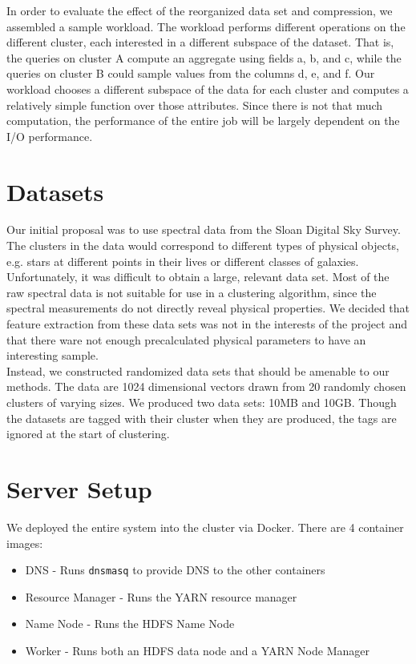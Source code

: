 \documentclass[paper=letter, fontsize=11pt]{scrartcl}
\numberwithin{equation}{section}		%
\numberwithin{figure}{section}			%
\numberwithin{table}{section}				%
\begin{document}
In order to evaluate the effect of the reorganized data set and compression, we assembled a sample workload. The workload performs different operations on the different cluster, each interested in a different subspace of the dataset.
That is, the queries on cluster A compute an aggregate using fields a, b, and c, while the queries on cluster B could sample values from the columns d, e, and f.
Our workload chooses a different subspace of the data for each cluster and computes a relatively simple function over those attributes.
Since there is not that much computation, the performance of the entire job will be largely dependent on the I/O performance.\\

\section{Datasets}
Our initial proposal was to use spectral data from the Sloan Digital Sky Survey.  The clusters in the data would correspond to different types of physical objects, e.g. stars at different points in their lives or different classes of galaxies.  Unfortunately, it was difficult to obtain a large, relevant data set.  Most of the raw spectral data is not suitable for use in a clustering algorithm, since the spectral measurements do not directly reveal physical properties.  We decided that feature extraction from these data sets was not in the interests of the project and that there ware not enough precalculated physical parameters to have an interesting sample. \\

Instead, we constructed randomized data sets that should be amenable to our methods.  The data are 1024 dimensional vectors drawn from 20 randomly chosen clusters of varying sizes.  We produced two data sets: 10MB and 10GB.  Though the datasets are tagged with their cluster when they are produced, the tags are ignored at the start of clustering.


\section{Server Setup}
We deployed the entire system into the cluster via Docker.
There are 4 container images:
\begin{itemize}
\item DNS - Runs \texttt{dnsmasq} to provide DNS to the other containers
\item Resource Manager - Runs the YARN resource manager
\item Name Node - Runs the HDFS Name Node
\item Worker - Runs both an HDFS data node and a YARN Node Manager
\end{itemize}
\end{document}
